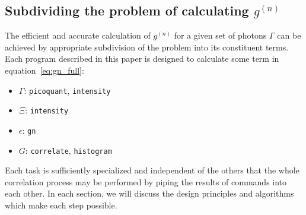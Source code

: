 \documentclass{article}
\newcommand{\picoquant}{\texttt{picoquant}}
\newcommand{\intensity}{\texttt{intensity}}
\newcommand{\correlate}{\texttt{correlate}}
\newcommand{\histogram}{\texttt{histogram}}
\newcommand{\gn}[1]{\ensuremath{g^{(#1)}}}
\newcommand{\photons}{\ensuremath{\Gamma}}
\newcommand{\integrationtime}{\ensuremath{\Xi}}
\newcommand{\resolution}{\ensuremath{\epsilon}}
\newcommand{\GN}{\texttt{gn}}
\newcommand{\correlationset}{\ensuremath{G}}
\begin{document}
\subsection{Subdividing the problem of calculating \gn{n}}
The efficient and accurate calculation of \gn{n} for a given set of photons \photons{} can be achieved by appropriate subdivision of the problem into its constituent terms. Each program described in this paper is designed to calculate some term in equation~\ref{eq:gn_full}:
\begin{itemize}
\item $\photons$: \picoquant, \intensity
\item $\integrationtime$: \intensity
\item $\resolution$: \GN
\item $\correlationset$: \correlate, \histogram
\end{itemize}
Each task is sufficiently specialized and independent of the others that the whole correlation process may be performed by piping the results of commands into each other. In each section, we will discuss the design principles and algorithms which make each step possible.
\end{document}
